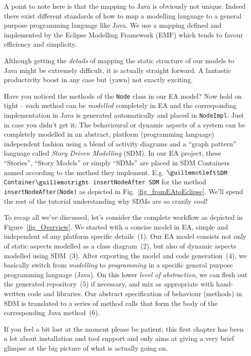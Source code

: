 A point to note here is that the mapping to Java is obviously not unique. 
Indeed there exist different standards of how to map a modelling language to a general purpose programming language like Java. 
We use a mapping defined and implemented by the Eclipse Modelling Framework (EMF) which tends to favour efficiency and simplicity.

Although getting the \emph{details} of mapping the static structure of our models to Java might be extremely difficult, it is actually straight forward.  
A fantastic productivity boost in any case but (yawn) not exactly exciting.

Have you noticed the methods of the \texttt{Node} class in our EA model? 
Now hold on tight -- each method can be \emph{modelled} completely in EA and the corresponding implementation in Java is generated automatically and placed in \texttt{NodeImpl}.  
Just in case you didn't get it: The behavioural or dynamic aspects of a system can be completely modelled in an abstract, platform (programming language) independent fashion using a blend of activity  diagrams and a ``graph pattern'' language called \textit{Story Driven Modelling} (SDM).  
In our EA project, these ``Stories'', ``Story Models'' or simply ``SDMs'' are  placed in SDM Containers named according to the method they implement.  
E.g.  \texttt{$\guillemotleft$SDM Container$\guillemotright$ insertNodeAfter SDM} for the method  \texttt{insertNodeAfter(Node)} as depicted in
Fig.~\ref{fig_fromEAtoEclipse}.  
We'll spend the rest of the tutorial understanding why SDMs are so  {\huge crazily} cool!
 
To recap all we've discussed, let's consider the complete workflow as depicted in Figure~\ref{fig_Overview}. 
We started with a concise model in EA, simple and independent of any platform specific details~(1).  
Our EA model consists not only of static aspects modelled as a class diagram~(2), but also of dynamic
aspects modelled using SDM~(3).  After exporting the model and code generation~(4), we basically switch from \emph{modelling} to \emph{programming} in a specific general purpose programming language (Java).  
On this lower \emph{level of abstraction}, we can flesh out the generated repository~(5) if necessary, and mix as appropriate with hand-written code and libraries.  Our abstract specification of behaviour (methods) in SDM is translated to a series of method calls that form the body of the corresponding Java method~(6).

If you feel a bit lost at the moment please be patient; this first chapter has been a lot about installation and tool support and only aims at giving a very brief glimpse at the big picture of what is actually going on.    

